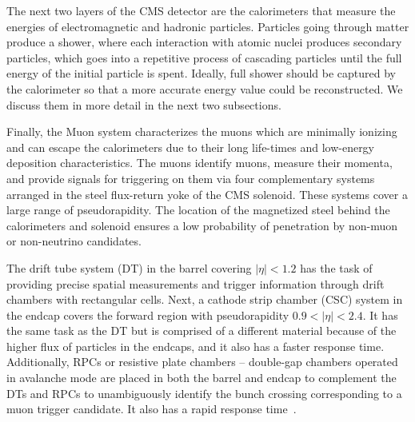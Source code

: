The next two layers of the CMS detector are the calorimeters that measure the energies of electromagnetic and hadronic particles. Particles going through matter produce a shower, where each interaction with atomic nuclei produces secondary particles, which goes into a repetitive process of cascading particles until the full energy of the initial particle is spent. Ideally, full shower should be captured by the calorimeter so that a more accurate energy value could be reconstructed. We discuss them in more detail in the next two subsections.

Finally, the Muon system characterizes the muons which are minimally ionizing and can escape the calorimeters due to their long life-times and low-energy deposition characteristics. The muons identify muons, measure their momenta, and provide signals for triggering on them via four complementary systems arranged in the steel flux-return yoke of the CMS solenoid. These systems cover a large range of pseudorapidity. The location of the magnetized steel behind the calorimeters and solenoid ensures a low probability of penetration by non-muon or non-neutrino candidates. 

The drift tube system (DT) in the barrel covering $|\eta| < 1.2$ has the task of providing precise spatial measurements and trigger information through drift chambers with rectangular cells. Next, a cathode strip chamber (CSC) system in the endcap covers the forward region with pseudorapidity $0.9 < |\eta| < 2.4$. It has the same task as the DT but is comprised of a different material because of the higher flux of particles in the endcaps, and it also has a faster response time. Additionally, RPCs or resistive plate chambers -- double-gap chambers operated in avalanche mode are placed in both the barrel and endcap to complement the DTs and RPCs to unambiguously identify the bunch crossing corresponding to a muon trigger candidate. It also has a rapid response time~\cite{CMS:2023gfb}.

